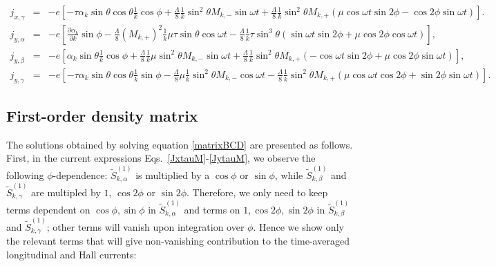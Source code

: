 \documentclass[reprint,amsmath,amssymb,aps,prb]{revtex4-1}
\begin{document}
\begin{widetext}
\begin{eqnarray}
j_{x,\gamma}&=&-e\left[-\tau\alpha_k\sin\theta\cos\theta\frac{1}{k}\cos\phi+\frac{\Lambda}{8}\frac{1}{k}\sin^2\theta M_{k,-}\sin\omega t+\frac{\Lambda}{8}\frac{1}{k}\sin^2\theta M_{k,+}(\mu\cos\omega t \sin 2 \phi-\cos 2 \phi\sin\omega t)\right]. 
\end{eqnarray}
%
\begin{eqnarray}
j_{y,\alpha}&=&-e\left[\frac{\partial \alpha_k}{\partial k} \sin\phi-\frac{\Lambda}{8}(M_{k,+})^2\frac{1}{k}\mu\tau\sin\theta\cos\omega t-\frac{\Lambda}{8}\frac{1}{k}\tau\sin^3\theta(\sin\omega t \sin 2\phi+\mu\cos 2 \phi\cos\omega t)\right], \\
j_{y,\beta}&=&-e\left[\alpha_k\sin\theta\frac{1}{k}\cos\phi+\frac{\Lambda}{8}\frac{1}{k}\mu\sin^2\theta M_{k,-}\sin\omega t+\frac{\Lambda}{8}\frac{1}{k}\sin^2\theta M_{k,+}(-\cos\omega t \sin 2 \phi+\mu\cos 2 \phi\sin\omega t)\right], \\
j_{y,\gamma}&=&-e\left[-\tau\alpha_k\sin\theta\cos\theta\frac{1}{k}\sin\phi-\frac{\Lambda}{8}\mu\frac{1}{k}\sin^2\theta M_{k,-}\cos\omega t-\frac{\Lambda}{8}\frac{1}{k}\sin^2\theta M_{k,+}(\mu\cos\omega t \cos 2 \phi+\sin 2 \phi\sin\omega t)\right].
\end{eqnarray}

\subsection{First-order density matrix} \label{sec:app1st}

The solutions obtained by solving equation \eqref{matrixBCD} %
are presented as follows. First, in the current expressions Eqs.~\eqref{JxtauM}-\eqref{JytauM}, we observe the following $\phi$-dependence: $\tilde{S}_{k,\alpha}^{(1)}$ is multiplied by a $\cos\phi$ or $\sin\phi$, while $\tilde{S}_{k,\beta}^{(1)}$ and  $\tilde{S}_{k,\gamma}^{(1)}$ are multipled by $1$, $\cos2\phi$ or $\sin2\phi$. Therefore, we only need to keep terms dependent on $\cos\phi, \sin\phi$ in $\tilde{S}_{k,\alpha}^{(1)}$ and terms on $1,\cos2\phi,\sin2\phi$ in $\tilde{S}_{k,\beta}^{(1)}$ and  $\tilde{S}_{k,\gamma}^{(1)}$; other terms will vanish upon integration over $\phi$. Hence we show only the relevant terms that will give non-vanishing contribution to the time-averaged longitudinal and Hall currents:


\end{widetext}
\end{document}
